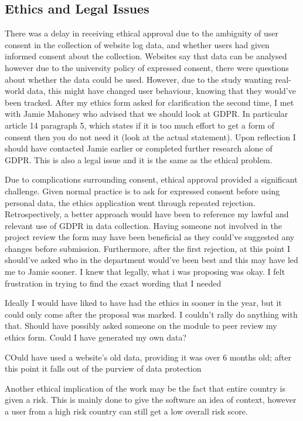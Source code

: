 \subsection{Ethics and Legal Issues}
There was a delay in receiving ethical approval due to the ambiguity of user consent in the collection of website log data, and whether users had given informed consent about the collection. Websites say that data can be analysed however due to the university policy of expressed consent, there were questions about whether the data could be used. However, due to the study wanting real-world data, this might have changed user behaviour, knowing that they would've been tracked. After my ethics form asked for clarification the second time, I met with Jamie Mahoney who advised that we should look at GDPR. In particular article 14 paragraph 5, which states if it is too much effort to get a form of consent then you do not need it (look at the actual statement). Upon reflection I should have contacted Jamie earlier or completed further research alone of GDPR. This is also a legal issue and it is the same as the ethical problem.

Due to complications surrounding consent, ethical approval provided a significant challenge. Given normal practice is to ask for expressed consent before using personal data, the ethics application went through repeated rejection. Retrospectively, a better approach would have been to reference my lawful and relevant use of GDPR in data collection. Having someone not involved in the project review the form may have been beneficial as they could've suggested any changes before submission. Furthermore, after the first rejection, at this point I should've asked who in the department would've been best and this may have led me to Jamie sooner. I knew that legally, what i was proposing was okay. I felt frustration in trying to find the exact wording that I needed

Ideally I would have liked to have had the ethics in sooner in the year, but it could only come after the proposal was marked. I couldn't rally do anything with that. Should have possibly asked someone on the module to peer review my ethics form. Could I have generated my own data? 

COuld have used a website's old data, providing it was over 6 months old; after this point it falls out of the purview of data protection

Another ethical implication of the work may be the fact that  entire country is given a risk. This is mainly done to give the software an idea of context, however a user from a high risk country can still get a low overall risk score.

